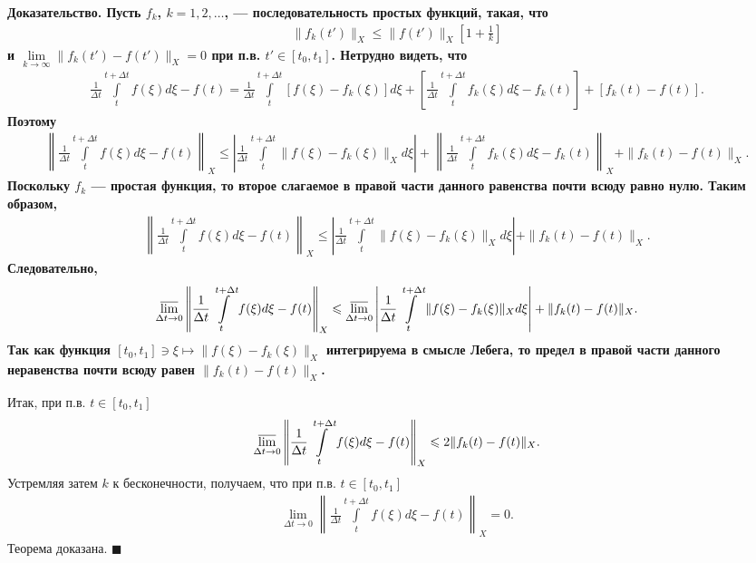 \documentclass{report}
\newenvironment{Proof}{\par\noindent\bf Доказательство.\rm}{ $\blacksquare$\par}
\begin{document}
\begin{Proof}
Пусть $f_k$, $k=1,2,\dots$, --- последовательность простых функций, такая, что
\begin{gather*}
\|f_k(t')\|_X\leqslant\|f(t')\|_X\left[1+\frac1k\right]
\end{gather*}
и $\lim\limits_{k\to\infty}\|f_k(t')-f(t')\|_X=0$ при п.в. $t'\in[t_0,t_1]$. Нетрудно видеть, что
\begin{gather*}
\frac1{\Delta t}\int\limits_{t}^{t+\Delta t}f(\xi)d\xi-f(t)=\frac1{\Delta t}\int\limits_{t}^{t+\Delta t}[f(\xi)-f_k(\xi)]d\xi+
\left[\frac1{\Delta t}\int\limits_{t}^{t+\Delta t}f_k(\xi)d\xi-f_k(t)\right]+[f_k(t)-f(t)].
\end{gather*}
Поэтому
\begin{gather*}
\left\|\frac1{\Delta t}\int\limits_{t}^{t+\Delta t}f(\xi)d\xi-f(t)\right\|_X\leqslant\left|\frac1{\Delta t}\int\limits_{t}^{t+\Delta t}
\|f(\xi)-f_k(\xi)\|_Xd\xi\right|+\left\|\frac1{\Delta t}\int\limits_{t}^{t+\Delta t}f_k(\xi)d\xi-f_k(t)\right\|_X+\|f_k(t)-f(t)\|_X.
\end{gather*}
Поскольку $f_k$ --- простая функция, то второе слагаемое в правой части данного равенства почти всюду равно нулю. Таким образом,
\begin{gather*}
\left\|\frac1{\Delta t}\int\limits_{t}^{t+\Delta t}f(\xi)d\xi-f(t)\right\|_X\leqslant\left|\frac1{\Delta t}\int\limits_{t}^{t+\Delta t}\|f(\xi)-f_k(\xi)\|_Xd\xi\right|+\|f_k(t)-f(t)\|_X.
\end{gather*}
Следовательно,
\begin{gather*}
\varlimsup\limits_{\Delta t\to0}\left\|\frac1{\Delta t}\int\limits_{t}^{t+\Delta t}f(\xi)d\xi-f(t)\right\|_X\leqslant
\varlimsup\limits_{\Delta t\to0}\left|\frac1{\Delta t}\int\limits_{t}^{t+\Delta t}\|f(\xi)-f_k(\xi)\|_Xd\xi\right|+\|f_k(t)-f(t)\|_X.
\end{gather*}
Так как функция $[t_0,t_1]\ni\xi\mapsto\|f(\xi)-f_k(\xi)\|_X$ интегрируема в смысле Лебега, то предел в правой части данного неравенства почти всюду равен $\|f_k(t)-f(t)\|_X$.

Итак, при п.в. $t\in[t_0,t_1]$
\begin{gather*}
\varlimsup\limits_{\Delta t\to0}\left\|\frac1{\Delta t}\int\limits_{t}^{t+\Delta t}f(\xi)d\xi-f(t)\right\|_X\leqslant2\|f_k(t)-f(t)\|_X.
\end{gather*}
Устремляя затем $k$ к бесконечности, получаем, что при п.в. $t\in[t_0,t_1]$
\begin{gather*}
\lim\limits_{\Delta t\to0}\left\|\frac1{\Delta t}\int\limits_{t}^{t+\Delta t}f(\xi)d\xi-f(t)\right\|_X=0.
\end{gather*}
Теорема доказана.
\end{Proof}
\end{document}
